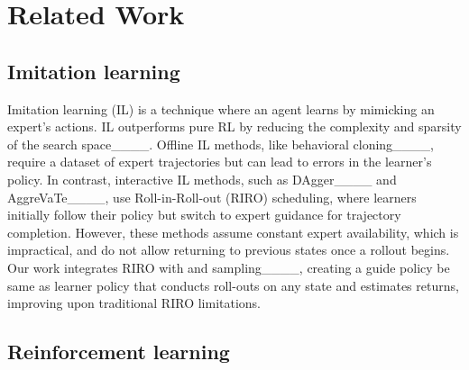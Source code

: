 \section{Related Work}
\label{sec:related}










\subsection{Imitation learning}



Imitation learning (IL) is a technique where an agent learns by mimicking an expert's actions. IL outperforms pure RL by reducing the complexity and sparsity of the search space____. Offline IL methods, like behavioral cloning____, require a dataset of expert trajectories but can lead to errors in the learner's policy. In contrast, interactive IL methods, such as DAgger____ and AggreVaTe____, use Roll-in-Roll-out (RIRO) scheduling, where learners initially follow their policy but switch to expert guidance for trajectory completion. However, these methods assume constant expert availability, which is impractical, and do not allow returning to previous states once a rollout begins. Our work integrates RIRO with {\TOPK and \TOPP sampling}____, creating a guide policy be same as learner policy that conducts roll-outs on any state and estimates returns, improving upon traditional RIRO limitations.







\subsection{Reinforcement learning} %

